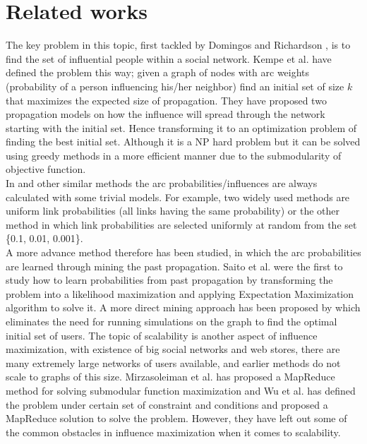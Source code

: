 \documentclass[english]{tktltiki}
\begin{document}
\section{Related works}
The key problem in this topic, first tackled by Domingos and Richardson \cite{domingo01}, is to find the set of influential people within a social network. 
Kempe et al. \cite{kempe03} have defined the problem this way; given a graph of nodes with arc weights (probability of a person influencing his/her neighbor) find an initial set of size $k$ that maximizes the expected size of propagation. They have  proposed two propagation models on how the influence will spread through the network starting with the initial set. Hence transforming it to an optimization problem of finding the best initial set. Although it is a NP hard problem but it can be solved using greedy methods in a more efficient manner due to the submodularity of objective function. \\
In \cite{kempe03} and other similar methods the arc probabilities/influences are always calculated with some trivial models. For example, two widely used methods are uniform link probabilities (all links having the same probability) or the other method in which link probabilities are selected uniformly at random from the set \{0.1, 0.01, 0.001\}.  \\
A more advance method therefore has been studied, in which the arc probabilities are learned through mining the past propagation. Saito et al. \cite{saito08} were the first to study how to learn probabilities from past propagation by transforming the problem into a likelihood maximization and applying Expectation Maximization algorithm to solve it. A more direct mining approach has been proposed by \cite{goyal11} which eliminates the need for running simulations on the graph to find the optimal initial set of users. 
The topic of scalability is another aspect of influence maximization, with existence of big social networks and web stores, there are many extremely large networks of users available, and earlier methods do not scale to graphs of this size. Mirzasoleiman et al. \cite{mks13} has proposed a MapReduce method for solving submodular function maximization and Wu et al. \cite{WYH13} has defined the problem under certain set of constraint and conditions and proposed a MapReduce solution to solve the problem. However, they have left out some of the common obstacles in influence maximization when it comes to scalability. 
\end{document}
